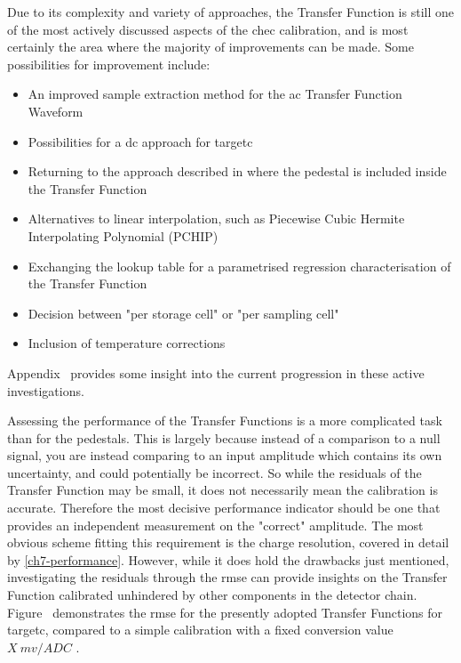 Due to its complexity and variety of approaches, the Transfer Function is still one of the most actively discussed aspects of the \gls{chec} calibration, and is most certainly the area where the majority of improvements can be made. Some possibilities for improvement include:
\begin{itemize}
	\item An improved sample extraction method for the \gls{ac} Transfer Function Waveform
	\item Possibilities for a \gls{dc} approach for \gls{targetc}
	\item Returning to the approach described in \cite{Albert2017} where the pedestal is included inside the Transfer Function
	\item Alternatives to linear interpolation, such as Piecewise Cubic Hermite Interpolating Polynomial (PCHIP)
	\item Exchanging the lookup table for a parametrised regression characterisation of the Transfer Function
	\item Decision between "per storage cell" or "per sampling cell"
	\item Inclusion of temperature corrections
\end{itemize}
Appendix~ provides some insight into the current progression in these active investigations.

Assessing the performance of the Transfer Functions is a more complicated task than for the pedestals. This is largely because instead of a comparison to a null signal, you are instead comparing to an input amplitude which contains its own uncertainty, and could potentially be incorrect. So while the residuals of the Transfer Function may be small, it does not necessarily mean the calibration is accurate. Therefore the most decisive performance indicator should be one that provides an independent measurement on the "correct" amplitude. The most obvious scheme fitting this requirement is the charge resolution, covered in detail by \ref{ch7-performance}. However, while it does hold the drawbacks just mentioned, investigating the residuals through the \gls{rmse} can provide insights on the Transfer Function calibrated unhindered by other components in the detector chain. Figure~ demonstrates the \gls{rmse} for the presently adopted Transfer Functions for \gls{targetc}, compared to a simple calibration with a fixed conversion value $X~mv/ADC$ .

